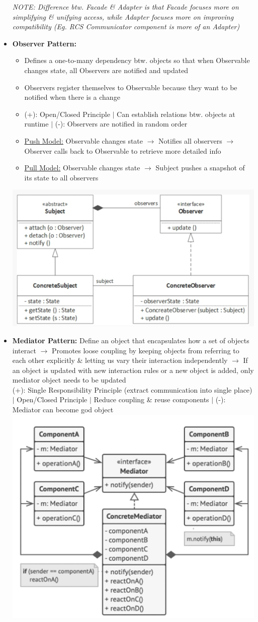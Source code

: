 \documentclass[landscape]{article}
\begin{document}
\begin{multicols*}{5}
\begin{itemize}
      \textit{NOTE: Difference btw. Facade \& Adapter is that Facade focuses more on simplifying \& unifying access, while Adapter focuses more on improving compatibility (Eg. RCS Communicator component is more of an Adapter)}
      \item \textbf{Observer Pattern:}
      \begin{itemize}
        \item Defines a one-to-many dependency btw. objects so that when Observable changes state, all Observers are notified and updated
        \item Observers register themselves to Observable because they want to be notified when there is a change
        \item (+): Open/Closed Principle $|$ Can establish relations btw. objects at runtime $|$ (-): Observers are notified in random order
        \item \underline{Push Model:} Observable changes state $\rightarrow$ Notifies all observers $\rightarrow$ Observer calls back to Observable to retrieve more detailed info
        \item \underline{Pull Model:} Observable changes state $\rightarrow$ Subject pushes a snapshot of its state to all observers
      \end{itemize}
      \includegraphics[width=0.65\linewidth]{13_observer_pattern.png}
      \item \textbf{Mediator Pattern:} Define an object that encapsulates how a set of objects interact $\rightarrow$ Promotes loose coupling by keeping objects from referring to each other explicitly \& letting us vary their interaction independently $\rightarrow$ If an object is updated with new interaction rules or a new object is added, only mediator object needs to be updated \\
      (+): Single Responsibility Principle (extract communication into single place) $|$ Open/Closed Principle $|$ Reduce coupling \& reuse components $|$ (-): Mediator can become god object
      \includegraphics[width=0.65\linewidth]{14_mediator_pattern.png}

\end{itemize}
\end{multicols*}
\end{document}
